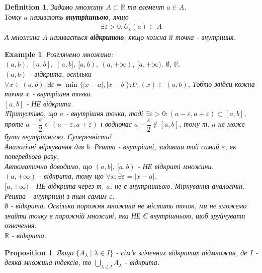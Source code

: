 \documentclass[a4paper, 14pt]{article}
\theoremstyle{theoremdd}
\theoremstyle{theoremdd}
\newtheorem{definition}[theorem]{Definition}
\theoremstyle{theoremdd}
\theoremstyle{theoremdd}
\newtheorem{example}[theorem]{Example}
\theoremstyle{theoremdd}
\newtheorem{proposition}[theorem]{Proposition}
\theoremstyle{theoremdd}
\theoremstyle{theoremdd}
\theoremstyle{theoremdd}
\begin{document}
	\begin{definition}
	Задамо множину $A \subset \mathbb{R}$ та елемент $a \in A$.\\
	Точку $a$ називають \textbf{внутрішньою}, якщо
	\begin{align*}
	\exists \varepsilon > 0: U_{\varepsilon}(a) \subset A
	\end{align*}
	А множина $A$ називається \textbf{відкритою}, якщо кожна її точка - внутрішня.
	\end{definition}

\begin{example}
Розглянемо множини: $(a,b), \ [a,b], \ (a,b], \ [a,b), \ (a,+\infty), \ [a,+\infty), \ \emptyset, \ \mathbb{R}$.\\
$(a,b)$ - відкрита, оскільки $\forall x \in (a,b): \exists \varepsilon = \min\{|x-a|,|x-b|\}:  U_{\varepsilon}(x) \subset (a,b)$. Тобто звідси кожна точка $x$ - внутрішня точка.
\bigskip \\
$[a,b]$ - НЕ відкрита.\\
!Припустімо, що $a$ - внутрішня точка, тоді $\exists \varepsilon > 0: (a-\varepsilon, a+\varepsilon) \subset [a,b]$, проте $a-\dfrac{\varepsilon}{2} \in (a - \varepsilon, a + \varepsilon)$ і водночас $a-\dfrac{\varepsilon}{2} \not \in [a,b]$, тому т. $a$ не може бути внутрішньою. Суперечність! \\
Аналогічні міркування для $b$. Решта - внутрішні, задавши той самий $\varepsilon$, як попередього разу.
\bigskip \\
Автоматично доводимо, що $(a,b], \ [a,b)$ - НЕ відкриті множини.
\bigskip \\
$(a,+\infty)$ - відкрита, тому що $\forall x: \exists \varepsilon = |x-a|$.
\bigskip \\
$[a,+\infty)$ - НЕ відкрита через т. $a$: не є внутрішньою. Міркування аналогічні. Решта - внутрішні з тим самим $\varepsilon$.
\bigskip \\
$\emptyset$ - відкрита. Оскільки порожня множина не містить точок, ми не зможемо знайти точку в порожній множині, яка НЕ Є внутрішньою, щоб зруйнувати означення.
\bigskip \\
$\mathbb{R}$ - відкрита.
\end{example}

\begin{proposition}
Якщо $\{A_{\lambda} \mid \lambda \in I\}$ - сім'я зліченних відкритих підмножин, де $I$ - деяка множина індексів, то $\displaystyle \bigcup_{\lambda \in I} A_{\lambda}$ - відкрита.
\end{proposition}
\end{document}

